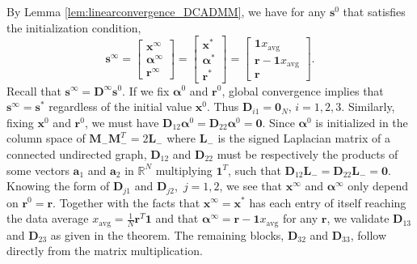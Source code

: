 \documentclass[journal]{IEEEtran}
\begin{document}
\begin{IEEEproof}
By Lemma \ref{lem:linearconvergence_DCADMM}, we have for any $\bm s^0$ that satisfies the initialization condition, $$\bm s^\infty = \left[\begin{array}{c} \bm x^{\infty} \\\bm\alpha^{\infty}\\\bm r^{\infty} \end{array} \right] = \left[\begin{array}{c} \bm x^{*} \\\bm\alpha^{*}\\\bm r^{*} \end{array} \right]=\left[\begin{array}{c} \bm1x_\text{avg}\\\bm r - \bm 1x_\text{avg}\\\bm r \end{array} \right].$$Recall that $\bm s^\infty=\bm D^\infty \bm s^0$. If we fix $\bm\alpha^0$ and $\bm r^0$, global convergence implies that $\bm s^\infty=\bm s^*$ regardless of the initial value $\bm x^0$. Thus $\bm D_{i1}=\bm 0_N$, $i=1,2,3$. Similarly, fixing $\bm x^0$ and $\bm r^0$, we must have $\bm D_{12}\bm\alpha^0=\bm D_{22}\bm \alpha^0=\bm 0$. Since $\bm\alpha^0$ is initialized in the column space of $\bm M_-\bm M_-^T=2\bm L_-$ where $\bm L_-$ is the signed Laplacian matrix of a connected undirected graph, $\bm D_{12}$ and $\bm D_{22}$ must be respectively the products of some vectors $\bm a_1$ and $\bm a_2$ in $\mathbb{R}^N$ multiplying $\bm 1^T$, such that $\bm D_{12}\bm L_-=\bm D_{22}\bm L_-=\bm 0$. Knowing the form of $\bm D_{j1}$ and $\bm D_{j2}$,~$j=1,2$, we see that $\bm x^\infty$ and $\bm\alpha^\infty$ only depend on $\bm r^0=\bm r$. Together with the facts that $\bm x^\infty=\bm x^*$ has each entry of itself reaching the data average $x_\text{avg}=\frac{1}{N}\bm r^T \bm 1$ and that $\bm\alpha^\infty=\bm r - \bm 1x_\text{avg}$ for any $\bm r$, we validate $\bm D_{13}$ and $\bm D_{23}$ as given in the theorem. The remaining blocks, $\bm D_{32}$ and $\bm D_{33}$, follow directly from the matrix multiplication.
\end{IEEEproof}
\end{document}
